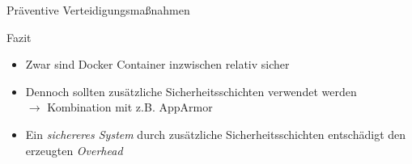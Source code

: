 \begin{frame}{Präventive Verteidigungsmaßnahmen}
  \begin{block}{Fazit}
    \begin{itemize}[<+->]
      \item Zwar sind Docker Container inzwischen relativ sicher
      \item Dennoch sollten zusätzliche Sicherheitsschichten verwendet werden \\
      $\rightarrow$ Kombination mit z.B. AppArmor
      \item Ein \textit{sichereres System} durch zusätzliche Sicherheitsschichten entschädigt den erzeugten \textit{Overhead}
    \end{itemize}
  \end{block}
\end{frame}
